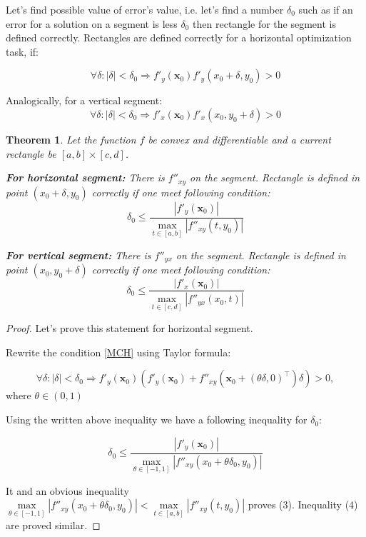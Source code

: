 \documentclass[12pt]{article}
\newtheorem{theorem}{Theorem}[section]
\begin{document}
Let's find possible value of error's value, i.e. let's find a number $\delta_0$ such as if an error for   a solution on a segment is less $\delta_0$ then rectangle for the segment is defined correctly. Rectangles are defined correctly for a horizontal optimization task, if:

\begin{equation}\label{MCH}
\forall\delta : |\delta| < \delta_0 \Rightarrow f'_y(\textbf{x}_0)f'_y(x_0+\delta, y_0) > 0
\end{equation}

Analogically, for a vertical segment:
\begin{equation}\label{MCV}
\forall\delta: |\delta| < \delta_0 \Rightarrow f'_x(\textbf{x}_0)f'_x(x_0, y_0+\delta) > 0
\end{equation}


\begin{theorem}
Let the function $f$ be convex and differentiable and a current rectangle be $[a,b]\times[c,d]$.

\textbf{For horizontal segment:}  There is $f''_{xy}$ on the segment. Rectangle is defined in point $(x_0 + \delta, y_0)$ correctly if one meet following condition:
\begin{equation}\label{C1}
\delta_0 \leq \frac{|f'_y(\textbf{x}_0)|}{\max\limits_{t\in [a,b]}|f''_{xy}(t, y_0)|}
\end{equation}

\textbf{For vertical segment:}  There is $f''_{yx}$ on the segment. Rectangle is defined in point $(x_0, y_0+\delta)$ correctly if one meet following condition:
\begin{equation}\label{C2}
\delta_0 \leq \frac{|f'_x(\textbf{x}_0)|}{\max\limits_{t\in [c,d]}|f''_{yx}(x_0, t)|}
\end{equation}

\end{theorem}
\begin{proof}

Let's prove this statement for horizontal segment.

Rewrite the condition \eqref{MCH} using Taylor formula:

$$\forall \delta:|\delta|<\delta_0\Rightarrow f'_y(\textbf{x}_0)\left(f'_y(\textbf{x}_0)+f''_{xy}\left(\textbf{x}_0+(\theta\delta,0)^\top\right)\delta\right) > 0,$$
where $\theta\in(0,1)$

Using the written above inequality we have a following inequality for $\delta_0$:

$$\delta_0\leq\frac{|f'_y(\textbf{x}_0)|}{\max\limits_{\theta \in [-1, 1]}|f''_{xy}(x_0 + \theta\delta_0, y_0)|}$$

It and an obvious inequality $\max\limits_{\theta \in [-1, 1]}|f''_{xy}(x_0 + \theta\delta_0, y_0)| < \max\limits_{t\in [a,b]}|f''_{xy}(t, y_0)|$ proves (3). Inequality (4) are proved similar.
\end{proof}
\end{document}
